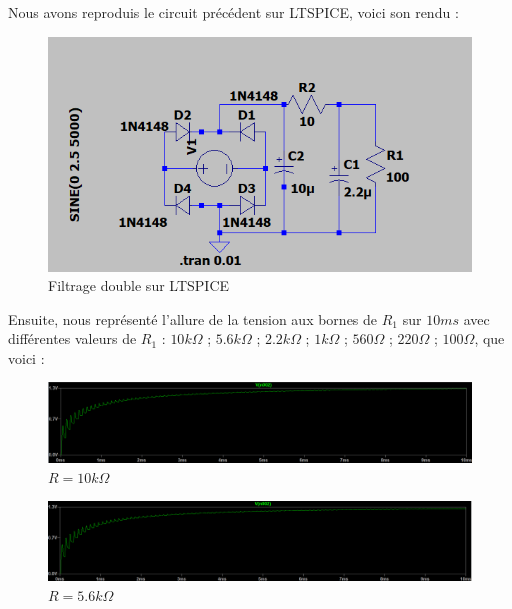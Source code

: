 Nous avons reproduis le circuit précédent sur LTSPICE, voici son rendu :

\begin{figure}[H]
    \begin{center}
    \includegraphics[scale=0.4]{images/LTSPICE/a.png}
    \caption{Filtrage double sur LTSPICE}
    \end{center}
\end{figure}

Ensuite, nous représenté l’allure de la tension aux bornes de $R_1$ sur $10 ms$ avec différentes valeurs de $R_1$ : $10k\Omega$ ; $5.6k\Omega$ ; $2.2k\Omega$ ; $1k\Omega$ ; $560\Omega$ ; $220\Omega$ ; $100\Omega$, que voici : 

\begin{figure}[H]
    \begin{center}
    \includegraphics[scale=0.25]{images/LTSPICE/b.png}
    \caption{$R=10k\Omega$}
    \end{center}
\end{figure}

\begin{figure}[H]
    \begin{center}
    \includegraphics[scale=0.25]{images/LTSPICE/c.png}
    \caption{$R=5.6k\Omega$}
    \end{center}
\end{figure}

